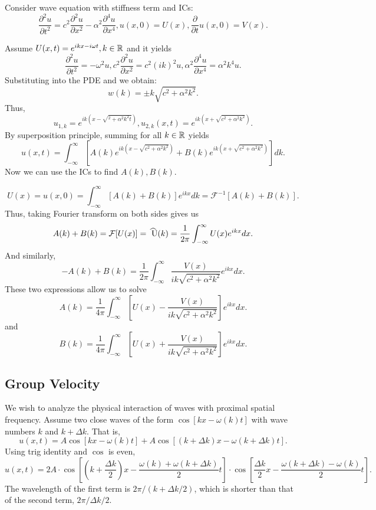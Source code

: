 \documentclass[class=article,crop=false]{standalone}
\begin{document}
\begin{eg}[]
Consider wave equation with stiffness term and ICs:
\[
	\frac{\partial^2 u}{\partial { t}^2} =c^2 \frac{\partial^2 u}{\partial { x}^2} - \alpha^2 \frac{\partial^4 u}{\partial { x}^4} , u(x,0) = U(x), \frac{\partial }{\partial t} u(x,0) = V(x)
.\] 

Assume $ U(x,t) = e^{ikx-i\omega t}, k \in \mathbb{R}$ and it yields
\[
	\frac{\partial^2 u}{\partial { t}^2} = -\omega^2 u, c^2 \frac{\partial^2 u}{\partial { x}^2} = c^2(ik)^2 u, \alpha^2 \frac{\partial^4 u}{\partial { x}^4} = \alpha^2 k^{4} u
.\] 
Substituting into the PDE and we obtain:
\[
	w(k) = \pm k \sqrt{c^2 + \alpha^2 k^2} 
.\] 
Thus,
\[
	u_{1,k} = e^{ik(x-\sqrt{^2+\alpha^2 k^2 t}) }, u_{2,k}(x,t) = e^{ik(x+ \sqrt{c^2+ \alpha^2 k^{2}} )}
.\] 
By superposition principle, summing for all $ k \in \mathbb{R}$ yields
\[
	u(x,t) = \int_{-\infty}^{\infty}  \left[ A(k) e^{ik (x-\sqrt{c^2+ \alpha^2 k^2}) } + B(k) e^{ik(x+ \sqrt{c^2+ \alpha^2 k^2} )} \right] dk
.\] 
Now we can use the ICs to find $ A(k),B(k)$.

\[
	U(x) = u(x,0) = \int_{-\infty}^{\infty} [A(k)+B(k)] e^{ikx} dk = \mathcal{ F}^{-1} [A(k)+B(k)]
.\] 
Thus, taking Fourier transform on both sides gives us
\[
	A(k)+B(k) = \mathcal{ F}[U(x)] = \wh{ U}(k) = \frac{1}{2\pi} \int_{-\infty}^{\infty} U(x) e^{ikx} dx 
.\] 
And similarly,
\[
	-A(k) + B(k) = \frac{1}{2\pi} \int_{-\infty}^{\infty} \frac{V(x)}{ik \sqrt{c^2+ \alpha^2 k^2}  } e^{ikx} dx 
.\] 
These two expressions allow us to solve
\[
	A(k) = \frac{1}{4\pi} \int_{-\infty}^{\infty} \left[ U(x) - \frac{V(x)}{ik \sqrt{c^2 + \alpha^2 k^2}  } \right]  e^{ikx} dx
.\] 
and
\[
	B(k) = \frac{1}{4\pi} \int_{-\infty}^{\infty} \left[ U(x) + \frac{V(x)}{ik \sqrt{c^2 + \alpha^2 k^2}  } \right]  e^{ikx} dx
.\] 

\end{eg}

\subsection{Group Velocity}

We wish to analyze the physical interaction of waves with proximal spatial frequency. Assume two close waves of the form $ \cos[kx-\omega(k) t]$ with wave numbers $ k$ and  $ k+ \Delta k$. That is,
\[
	u(x,t) = A \cos[kx - \omega(k) t] + A \cos[(k+\Delta k)x-\omega(k+ \Delta k )t]
.\] 
Using trig identity and $ \cos$ is even,
\[
	u(x,t) = 2A \cdot \cos\left[ \left( k+ \frac{\Delta k}{2 } \right) x - \frac{\omega(k)+\omega (k+ \Delta k)}{2 } t\right] \cdot  \cos\left[ \frac{\Delta k}{2 } x - \frac{\omega(k+\Delta k)- \omega(k)}{2 } t\right] 
.\] 
The wavelength of the first term is $ 2\pi / (k+\Delta k /2)$, which is shorter than that of the second term, $ 2\pi / \Delta k / 2$. 
\end{document}
